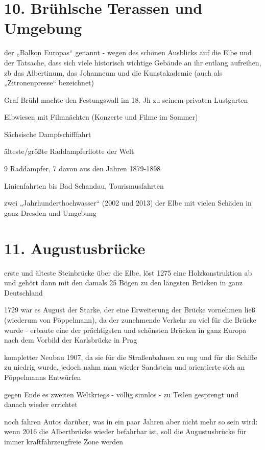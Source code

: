 \documentclass[a4paper,12pt]{report}
\begin{document}
\section{10. Brühlsche Terassen und Umgebung}
\begin{itemize*}
\item der „Balkon Europas“ genannt - wegen des schönen Ausblicks auf die Elbe und der Tatsache, dass sich viele historisch wichtige Gebäude an ihr entlang aufreihen, zb das Albertinum, das Johanneum und die Kunstakademie (auch als „Zitronenpresse“ bezeichnet)
\item Graf Brühl machte den Festungswall im 18. Jh zu seinem privaten Lustgarten
\item Elbwiesen mit Filmnächten (Konzerte und Filme im Sommer)
\item Sächsische Dampfschifffahrt
    \begin{itemize*}
    \item älteste/größte Raddampferflotte der Welt
    \item 9 Raddampfer, 7 davon aus den Jahren 1879-1898
    \item Linienfahrten bis Bad Schandau, Tourismusfahrten
    \end{itemize*}
\item zwei „Jahrhunderthochwasser“ (2002 und 2013) der Elbe mit vielen Schäden in ganz Dresden und Umgebung
\end{itemize*}

\section{11. Augustusbrücke}
\begin{itemize*}
\item erste und älteste Steinbrücke über die Elbe, löst 1275 eine Holzkonstruktion ab und gehört dann mit den damals 25 Bögen zu den längsten Brücken in ganz Deutschland
\item 1729 war es August der Starke, der eine Erweiterung der Brücke vornehmen ließ (wiederum von Pöppelmann), da der zunehmende Verkehr zu viel für die Brücke wurde - erbaute eine der prächtigsten und schönsten Brücken in ganz Europa nach dem Vorbild der Karlsbrücke in Prag
\item kompletter Neubau 1907, da sie für die Straßenbahnen zu eng und für die Schiffe zu niedrig wurde, jedoch nahm man wieder Sandstein und orientierte sich an Pöppelmanns Entwürfen
\item gegen Ende es zweiten Weltkriegs - völlig sinnlos - zu Teilen gesprengt und danach wieder errichtet
\item noch fahren Autos darüber, was in ein paar Jahren aber nicht mehr so sein wird: wenn 2016 die Albertbrücke wieder befahrbar ist, soll die Augustusbrücke für immer kraftfahrzeugfreie Zone werden
\end{itemize*}
\end{document}
